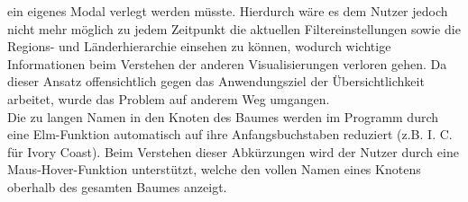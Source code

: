 \documentclass[usegeometry=true]{scrartcl}
\begin{document}
ein eigenes Modal verlegt werden müsste. Hierdurch wäre es dem Nutzer jedoch nicht mehr möglich zu jedem Zeitpunkt die aktuellen Filtereinstellungen sowie die Regions- und Länderhierarchie einsehen zu können, wodurch wichtige Informationen beim Verstehen der anderen Visualisierungen verloren gehen. Da dieser Ansatz offensichtlich gegen das Anwendungsziel der Übersichtlichkeit arbeitet, wurde das Problem auf anderem Weg umgangen.\\ Die zu langen Namen in den Knoten des Baumes werden im Programm durch eine Elm-Funktion automatisch auf ihre Anfangsbuchstaben reduziert (z.B. \glqq I. C.\grqq{} für Ivory Coast). Beim Verstehen dieser Abkürzungen wird der Nutzer durch eine Maus-Hover-Funktion unterstützt, welche den vollen Namen eines Knotens oberhalb des gesamten Baumes anzeigt.\\
\end{document}
